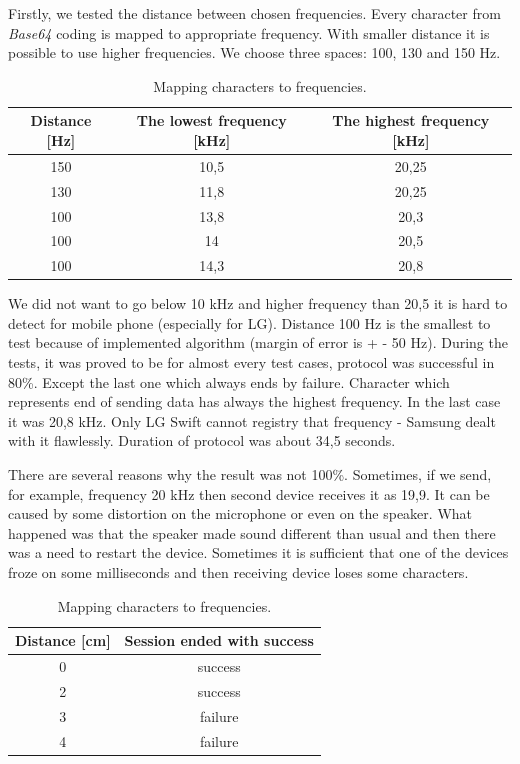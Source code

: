 \documentclass[11pt,titlepage]{article}
\theoremstyle{plain}
\begin{document}
Firstly, we tested  the distance between chosen frequencies. Every character from \textit{Base64} coding is mapped to appropriate frequency. With smaller distance it is possible to use higher frequencies. We choose three spaces: 100, 130 and 150 Hz.
\begin{table}[H]
	\centering
	\begin{tabular}{| c | c | c |}
		\hline
		Distance [Hz] & The lowest frequency [kHz] & The highest frequency [kHz]\\
		\hline
		150 & 10,5 & 20,25 \\
		\hline
		130 & 11,8 & 20,25 \\
		\hline
		100 & 13,8 & 20,3 \\
		\hline
		100 & 14 & 20,5 \\
		\hline
		100 & 14,3 & 20,8 \\
		\hline
	\end{tabular}
	\caption{Mapping characters to frequencies.}
\end{table}

We did not want to go below 10 kHz and higher frequency than 20,5 it is hard to detect for mobile phone (especially for LG). Distance 100 Hz is the smallest to test because of implemented algorithm (margin of error is + - 50 Hz). During the tests, it was proved to be for almost every test cases, protocol was successful in 80\%. Except the last one which always ends by failure. Character which represents end of sending data has always the highest frequency. In the last case it was 20,8 kHz. Only LG Swift cannot registry that frequency - Samsung dealt with it flawlessly. Duration of protocol was about 34,5 seconds.

\vspace{5mm}

There are several reasons why the result was not 100\%. Sometimes, if we send, for example, frequency 20 kHz then second device receives it as 19,9. It can be caused by some distortion on the microphone or even on the speaker. What happened was that the speaker made sound different than usual and then there was a need to restart the device. Sometimes it is sufficient that one of the devices froze on some milliseconds and then receiving device loses some characters. 

\vspace{5mm}

\begin{table}[H]
	\centering
	\begin{tabular}{| c | c |}
		\hline
		Distance [cm] & Session ended with success \\
		\hline
		0 & success \\
		\hline
		2 & success \\
		\hline
		3 & failure \\
		\hline
		4 & failure \\
		\hline
	\end{tabular}
	\caption{Mapping characters to frequencies.}
\end{table}
\end{document}

